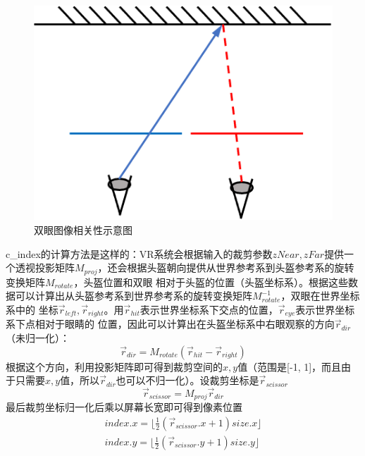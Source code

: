\documentclass[UTF8]{ctexart}
\begin{document}
        \begin{figure}[htbp]
        \centering
        \includegraphics[scale=0.6]{pic/BinocularCorrelation.png}
        \caption{双眼图像相关性示意图}
        \label{fig:3}
        \end{figure}
        
        c\_index的计算方法是这样的：VR系统会根据输入的裁剪参数$zNear, zFar$提供一个透视投影矩阵$M_{proj}$，还会根据头盔朝向提供从世界参考系到头盔参考系的旋转变换矩阵$M_{rotate}$，头盔位置和双眼
        相对于头盔的位置（头盔坐标系）。根据这些数据可以计算出从头盔参考系到世界参考系的旋转变换矩阵$M^{-1}_{rotate}$，双眼在世界坐标系中的
        坐标$\overrightarrow{r}_{left}, \overrightarrow{r}_{right}$。用$\overrightarrow{r}_{hit}$表示世界坐标系下交点的位置，$\overrightarrow{r}_{eye}$表示世界坐标系下点相对于眼睛的
        位置，因此可以计算出在头盔坐标系中右眼观察的方向$\overrightarrow{r}_{dir}$（未归一化）：
        \begin{equation}
            \overrightarrow{r}_{dir}=M_{rotate}(\overrightarrow{r}_{hit}-\overrightarrow{r}_{right})
        \end{equation}
        根据这个方向，利用投影矩阵即可得到裁剪空间的$x,y$值（范围是[-1, 1]，而且由于只需要$x, y$值，所以$\overrightarrow{r}_{dir}$也可以不归一化）。设裁剪坐标是$\overrightarrow{r}_{scissor}$
        \begin{equation}
            \overrightarrow{r}_{scissor}=M_{proj}\overrightarrow{r}_{dir}
        \end{equation}
        最后裁剪坐标归一化后乘以屏幕长宽即可得到像素位置
        \begin{equation}
            \begin{array}{c}
                index.x=\lfloor\frac{1}{2}(\overrightarrow{r}_{scissor}.x+1)size.x\rfloor\\
                index.y=\lfloor\frac{1}{2}(\overrightarrow{r}_{scissor}.y+1)size.y\rfloor\\
            \end{array}
        \end{equation}
        
\end{document}
